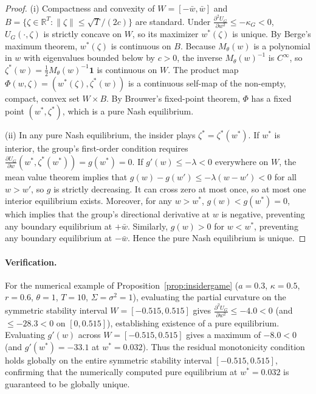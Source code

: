 \begin{proof}
(i) Compactness and convexity of $W=[-\bar w,\bar w]$ and $B=\{\zeta\in\mathbb R^T:\|\zeta\|\le\sqrt T/(2c)\}$ are standard. Under $\frac{\partial^2 U_G}{\partial w^2}\le-\kappa_G<0$, $U_G(\cdot,\zeta)$ is strictly concave on $W$, so its maximizer $w^*(\zeta)$ is unique. By Berge's maximum theorem, $w^*(\zeta)$ is continuous on $B$. Because $M_\theta(w)$ is a polynomial in $w$ with eigenvalues bounded below by $c>0$, the inverse $M_\theta(w)^{-1}$ is $C^\infty$, so $\zeta^*(w)=\frac12 M_\theta(w)^{-1}\mathbf 1$ is continuous on $W$. The product map $\Phi(w,\zeta)=(w^*(\zeta),\zeta^*(w))$ is a continuous self-map of the non-empty, compact, convex set $W\times B$. By Brouwer's fixed-point theorem, $\Phi$ has a fixed point $(w^*,\zeta^*)$, which is a pure Nash equilibrium.

(ii) In any pure Nash equilibrium, the insider plays $\zeta^*=\zeta^*(w^*)$. If $w^*$ is interior, the group's first-order condition requires $\frac{\partial U_G}{\partial w}(w^*,\zeta^*(w^*))=g(w^*)=0$. If $g'(w)\le-\lambda<0$ everywhere on $W$, the mean value theorem implies that $g(w)-g(w')\le-\lambda(w-w')<0$ for all $w>w'$, so $g$ is strictly decreasing. It can cross zero at most once, so at most one interior equilibrium exists. Moreover, for any $w>w^*$, $g(w)<g(w^*)=0$, which implies that the group's directional derivative at $w$ is negative, preventing any boundary equilibrium at $+\bar w$. Similarly, $g(w)>0$ for $w<w^*$, preventing any boundary equilibrium at $-\bar w$. Hence the pure Nash equilibrium is unique.
\end{proof}

\paragraph{Verification.} For the numerical example of Proposition~\ref{prop:insidergame} ($a=0.3$, $\kappa=0.5$, $r=0.6$, $\theta=1$, $T=10$, $\Sigma=\sigma^2=1$), evaluating the partial curvature on the symmetric stability interval $W=[-0.515,0.515]$ gives $\frac{\partial^2 U_G}{\partial w^2}\le-4.0<0$ (and $\le-28.3<0$ on $[0,0.515]$), establishing existence of a pure equilibrium. Evaluating $g'(w)$ across $W=[-0.515,0.515]$ gives a maximum of $-8.0<0$ (and $g'(w^*)=-33.1$ at $w^*=0.032$). Thus the residual monotonicity condition holds globally on the entire symmetric stability interval $[-0.515,0.515]$, confirming that the numerically computed pure equilibrium at $w^*=0.032$ is guaranteed to be globally unique.

